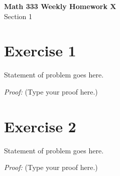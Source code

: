 \documentclass{article}
\begin{document}
\begin{center}
    \Large \textbf{Math 333 Weekly Homework X} \\
    \vspace{0.2cm}
    \normalsize Section 1
\end{center}
\vspace{1cm} %

\section*{Exercise 1}
Statement of problem goes here.

\vspace{0.5cm}
\textit{Proof:} (Type your proof here.)

\vspace{1cm} %

\section*{Exercise 2}
Statement of problem goes here.

\vspace{0.5cm}
\textit{Proof:} (Type your proof here.)
\end{document}
